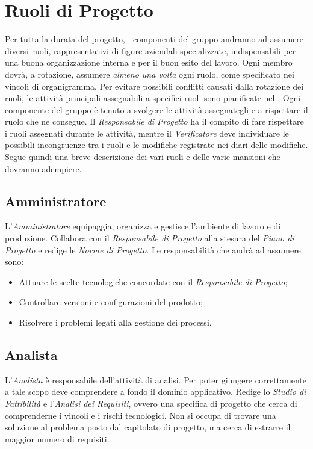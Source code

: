 \section{Ruoli di Progetto}

Per tutta la durata del progetto, i componenti del gruppo andranno ad assumere diversi ruoli, rappresentativi di figure aziendali specializzate, indispensabili per una buona organizzazione interna e per il buon esito del lavoro. Ogni membro dovrà, a rotazione, assumere \textit{almeno una volta} ogni ruolo, come specificato nei vincoli di organigramma. Per evitare possibili conflitti causati dalla rotazione dei ruoli, le attività
principali assegnabili a specifici ruoli sono pianificate nel \PianoDiProgetto{}. Ogni componente del
gruppo è tenuto a svolgere le attività assegnategli e a rispettare il ruolo che ne consegue. Il \textit{Responsabile
di Progetto} ha il compito di fare rispettare i ruoli assegnati durante le attività, mentre il \textit{Verificatore}
deve individuare le possibili incongruenze tra i ruoli e le modifiche registrate nei diari delle modifiche.
Segue quindi una breve descrizione dei vari ruoli e delle varie mansioni che dovranno adempiere.

\subsection{Amministratore}
L'\textit{Amministratore} equipaggia, organizza e gestisce l'ambiente di lavoro e di produzione. Collabora con il \textit{Responsabile di Progetto} alla stesura del \textit{Piano di Progetto} e redige le \textit{Norme di Progetto}. Le responsabilità che andrà ad assumere sono:
\begin{itemize}
\item Attuare le scelte tecnologiche concordate con il \textit{Responsabile di Progetto};
\item Controllare versioni e configurazioni del prodotto;
\item Risolvere i problemi legati alla gestione dei processi.
\end{itemize}

\subsection{Analista}
L'\textit{Analista} è responsabile dell'attività di analisi. Per poter giungere correttamente a tale scopo deve comprendere a fondo il dominio applicativo. Redige lo \textit{Studio di Fattibilità} e l'\textit{Analisi dei Requisiti}, ovvero una specifica di progetto che cerca di comprenderne i vincoli e i rischi tecnologici. Non si occupa di trovare una soluzione al problema posto dal capitolato di progetto, ma cerca di estrarre il maggior numero di requisiti.

